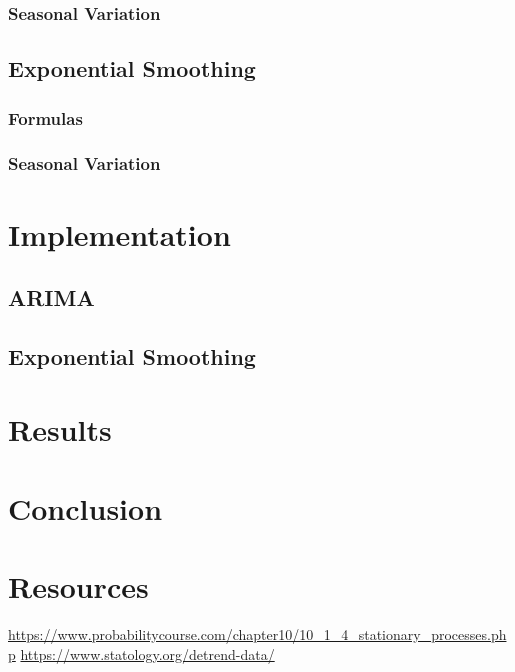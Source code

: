 \documentclass{article}
\begin{document}
  \subsubsection{Seasonal Variation}
  \subsection{Exponential Smoothing}
  \subsubsection{Formulas}
  \subsubsection{Seasonal Variation}

  \section{Implementation}
  \subsection{ARIMA}
  \subsection{Exponential Smoothing}

  \section{Results}

  \section{Conclusion}

  \section{Resources}
  \url{https://www.probabilitycourse.com/chapter10/10_1_4_stationary_processes.php}
  \url{https://www.statology.org/detrend-data/}

  \newpage
\end{document}
